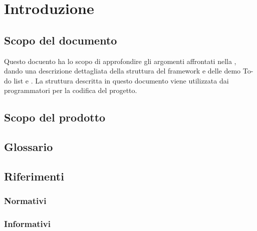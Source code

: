 \section{Introduzione}

\subsection{Scopo del documento}
Questo docuento ha lo scopo di approfondire gli argomenti affrontati nella \SpecificaTecnica{}, dando una descrizione dettagliata della struttura del framework \ProjectName{} e delle demo To-do list e \DemoName{}. La struttura descritta in questo documento viene utilizzata dai programmatori per la codifica del progetto.

\subsection{Scopo del prodotto}
\ScopoDelProdotto

\subsection{Glossario}
\GlossarioIntroduzione

\subsection{Riferimenti}
\subsubsection{Normativi}
\subsubsection{Informativi}
